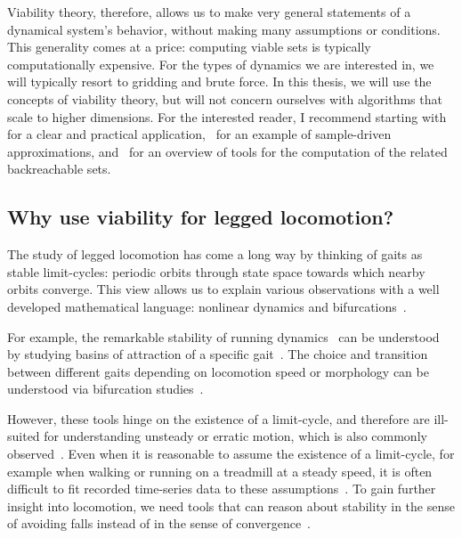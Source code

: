 Viability theory, therefore, allows us to make very general statements of a dynamical system's behavior, without making many assumptions or conditions. This generality comes at a price: computing viable sets is typically computationally expensive. For the types of dynamics we are interested in, we will typically resort to gridding and brute force. In this thesis, we will use the concepts of viability theory, but will not concern ourselves with algorithms that scale to higher dimensions. For the interested reader, I recommend starting with~\cite{liniger2017real} for a clear and practical application,~\cite{deffuant2007approximating} for an example of sample-driven approximations, and~\cite{bansal2017hamilton} for an overview of tools for the computation of the related backreachable sets.

\subsection{Why use viability for legged locomotion?}

The study of legged locomotion has come a long way by thinking of gaits as stable limit-cycles: periodic orbits through state space towards which nearby orbits converge. This view allows us to explain various observations with a well developed mathematical language: nonlinear dynamics and bifurcations~\cite{strogatz2018nonlinear}. \par
For example, the remarkable stability of running dynamics~\cite{daley2006running} can be understood by studying basins of attraction of a specific gait~\cite{merker2015stable,cnops2015basin}. The choice and transition between different gaits depending on locomotion speed or morphology can be understood via bifurcation studies~\cite{owaki2013simple,aoi2013stability,gan2018all}. \par

However, these tools hinge on the existence of a limit-cycle, and therefore are ill-suited for understanding unsteady or erratic motion, which is also commonly observed~\cite{wheatley2015escape,moore2017unpredictability}.
Even when it is reasonable to assume the existence of a limit-cycle, for example when walking or running on a treadmill at a steady speed, it is often difficult to fit recorded time-series data to these assumptions~\cite{bruijn2013assessing, maus2015constructing}. To gain further insight into locomotion, we need tools that can reason about stability in the sense of avoiding falls instead of in the sense of convergence~\cite{Birn-Jeffery3786}. \par

